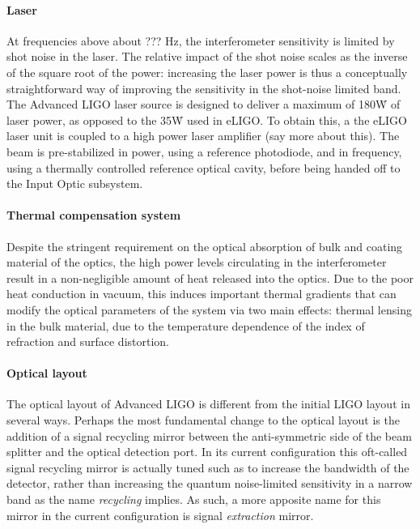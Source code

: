 \paragraph*{Laser}
At frequencies above about ??? Hz, the interferometer sensitivity is limited by shot 
noise in the laser. The relative impact of the shot noise scales as the inverse of the 
square root of the power: increasing the laser power is thus a conceptually 
straightforward way of improving the sensitivity in the shot-noise limited band. 
The Advanced LIGO laser source is designed to deliver a maximum of 180\.W of 
laser power, as opposed to the 35\.W used in eLIGO. To obtain this, a the eLIGO 
laser unit is coupled to a high power laser amplifier (say more about this). The 
beam is pre-stabilized in power, using a reference photodiode, and in frequency, 
using a thermally controlled reference optical cavity, before being handed off to the Input Optic subsystem.

\paragraph*{Thermal compensation system}
Despite the stringent requirement on the optical absorption of bulk and coating 
material of the optics, the high power levels circulating in the interferometer result 
in a non-negligible amount of heat released into the optics. Due to the poor heat 
conduction in vacuum, this induces important thermal gradients that can modify 
the optical parameters of the system via two main effects: thermal lensing in the 
bulk material, due to the temperature dependence of the index of refraction  
and surface distortion. 

\paragraph*{Optical layout}
The optical layout of Advanced LIGO is different from the initial LIGO layout in several ways. 
Perhaps the most fundamental change to the optical layout is the addition of a signal recycling 
mirror between the anti-symmetric side of the beam splitter and the optical detection port. 
In its current configuration this oft-called signal recycling mirror is actually tuned such as to 
increase the bandwidth of the detector, rather than increasing the quantum noise-limited sensitivity
in a narrow band as the name \emph{recycling} implies. As such, a more apposite name for this mirror 
in the current configuration is signal \emph{extraction} mirror. 

